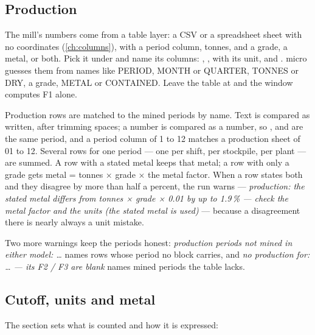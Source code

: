 \subsection{Production}\label{sec:factors-production}
The mill's numbers come from a table layer: a CSV or a spreadsheet sheet with no coordinates (\cref{ch:columns}), with a period column, tonnes, and a grade, a metal, or both. Pick it under  and name its columns: , ,  with its unit, and . micro guesses them from names like PERIOD, MONTH or QUARTER, TONNES or DRY, a grade, METAL or CONTAINED. Leave the table at  and the window computes F1 alone.

Production rows are matched to the mined periods by name. Text is compared as written, after trimming spaces; a number is compared as a number, so ,  and  are the same period, and a period column of 1 to 12 matches a production sheet of 01 to 12. Several rows for one period — one per shift, per stockpile, per plant — are summed. A row with a stated metal keeps that metal; a row with only a grade gets metal = tonnes × grade × the metal factor. When a row states both and they disagree by more than half a percent, the run warns — \emph{production: the stated metal differs from tonnes × grade × 0.01 by up to 1.9\,\% — check the metal factor and the units (the stated metal is used)} — because a disagreement there is nearly always a unit mistake.

Two more warnings keep the periods honest: \emph{production periods not mined in either model: …} names rows whose period no block carries, and \emph{no production for: … — its F2 / F3 are blank} names mined periods the table lacks.

\subsection{Cutoff, units and metal}\label{sec:factors-report}
The  section sets what is counted and how it is expressed:

